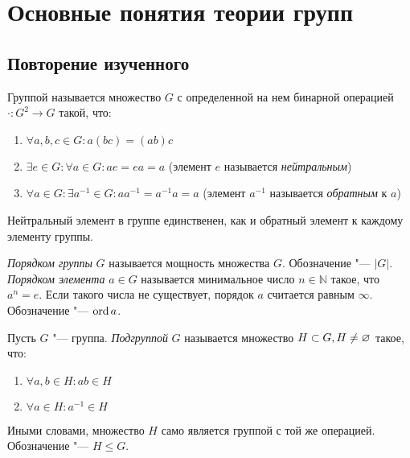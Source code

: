 \section{Основные понятия теории групп}

\subsection{Повторение изученного}

\begin{definition}
	Группой называется множество $G$ с определенной на нем бинарной операцией $\cdot: G^2 \to G$ такой, что:
	\begin{enumerate}
		\item $\forall a, b, c \in G: a(bc) = (ab)c$
		
		\item $\exists e \in G: \forall a \in G: ae = ea = a$ (элемент $e$ называется \textit{нейтральным})
		
		\item $\forall a \in G: \exists a^{-1} \in G: aa^{-1} = a^{-1}a = a$ (элемент $a^{-1}$ называется \textit{обратным} к $a$)
	\end{enumerate}
\end{definition}

\begin{reminder}
	Нейтральный элемент в группе единственен, как и обратный элемент к каждому элементу группы.
\end{reminder}

\begin{definition}
	\textit{Порядком группы} $G$ называется мощность множества $G$. Обозначение "--- $|G|$. \textit{Порядком элемента} $a \in G$ называется минимальное число $n \in \mathbb{N}$ такое, что $a^n = e$. Если такого числа не существует, порядок $a$ считается равным $\infty$. Обозначение "--- $\operatorname{ord}{a}$.
\end{definition}

\begin{definition}
	Пусть $G$ "--- группа. \textit{Подгруппой} $G$ называется множество $H \subset G, H \hm\ne \emptyset$ такое, что:
	\begin{enumerate}
		\item $\forall a, b \in H: ab \in H$
		
		\item $\forall a \in H: a^{-1} \in H$
	\end{enumerate}
	
	Иными словами, множество $H$ само является группой с той же операцией. Обозначение "--- $H \le G$.
\end{definition}

